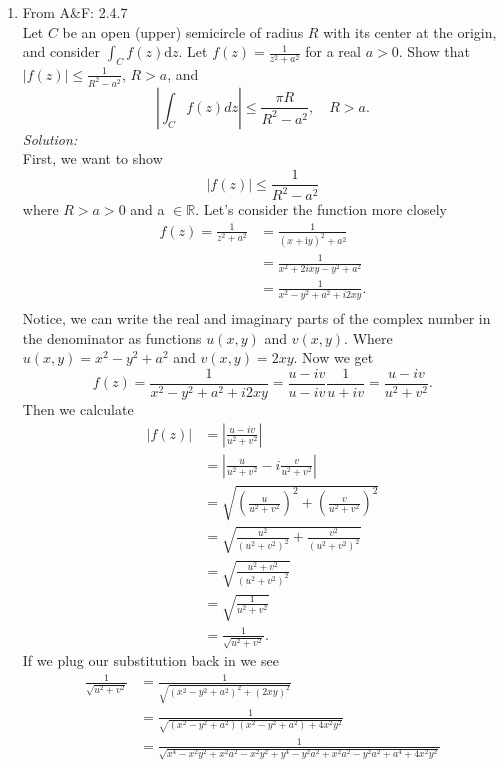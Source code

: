 \documentclass[10pt]{amsart}
\newcommand{\D}{\mathrm{d}}
\newcommand{\I}{\mathrm{i}}
\theoremstyle{nonumberplain}
\begin{document}
\begin{enumerate}[label={\bf {\arabic*}:}]
\item From A\&F: 2.4.7 \\
Let $C$ be an open (upper) semicircle of radius $R$ with its center at the origin, and consider $\int_C f(z) \D z$.
 Let $f(z) = \frac{1}{z^2 + a^2}$ for a real $a > 0$.
Show that $\left| f(z) \right| \leq \frac{1}{R^2 - a^2}$, $R > a$, and
$$
\left| \int_C f(z) dz \right| \leq \frac{\pi R}{R^2 - a^2}, \quad R > a.
$$
\textit{Solution:} \\
First, we want to show
$$
\left| f(z) \right| \leq \frac{1}{R^2 - a^2}
$$
where $R > a > 0$ and a $\in \mathbb R$.
Let's consider the function more closely
\begin{align*}
f(z) =  \frac{1}{z^2 + a^2} &= \frac{1}{(x + \I y)^2 + a^2} \\
	&= \frac{1}{x^2 + 2ixy - y^2 + a^2} \\
	&= \frac{1}{x^2 - y^2 + a^2 + i2xy }. \\
\end{align*}
Notice, we can write the real and imaginary parts of the complex number in the denominator as functions $u(x, y)$ and $v(x, y)$.
Where $u(x, y) = x^2 - y^2 + a^2$ and $v(x, y) = 2xy$.
Now we get 
$$
f(z) = \frac{1}{x^2 - y^2 + a^2 + i2xy }	 = \frac{u - iv }{u - iv }\frac{1}{u + iv } = \frac{u - iv }{u^2 + v^2 }.
$$
Then we calculate
\begin{align*}
\left| f(z) \right| &= \left| \frac{u - iv }{u^2 + v^2 } \right| \\
	&= \left| \frac{u }{u^2 + v^2 } - i\frac{v}{u^2 + v^2 } \right| \\
	&= \sqrt{
		\left(\frac{u }{u^2 + v^2 }\right)^2 + \left(\frac{v }{u^2 + v^2 }\right)^2
	} \\
	&= \sqrt{
		\frac{u^2 }{\left( u^2 + v^2 \right)^2} + \frac{v^2 }{\left( u^2 + v^2 \right)^2}
	} \\
	&= \sqrt{
		\frac{u^2 + v^2 }{\left( u^2 + v^2 \right)^2}
	} \\
	&= \sqrt{
		\frac{1}{u^2 + v^2}
	} \\
	&= \frac{1}{\sqrt{u^2 + v^2}}.
\end{align*}
If we plug our substitution back in we see
\begin{align*}
\frac{1}{\sqrt{u^2 + v^2}} &= \frac{1}{\sqrt{\left(x^2 - y^2 + a^2 \right)^2 + \left(2xy \right)^2}} \\
	&= \frac{1}{\sqrt{\left(x^2 - y^2 + a^2 \right)\left(x^2 - y^2 + a^2 \right) + 4x^2y^2}} \\
	&= \frac{1}{
		\sqrt{
			x^4 - x^2y^2 + x^2a^2 -x^2y^2 + y^4 - y^2a^2 + x^2a^2 - y^2a^2 + a^4 + 4x^2y^2
}}
\end{align*}
\end{enumerate}
\end{document}
